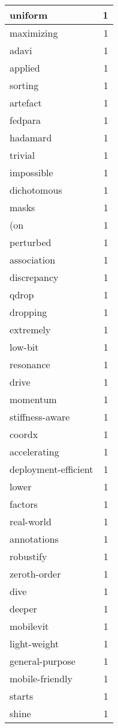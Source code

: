 \begin{table}[h]
\begin{tabular}{|l|r|}
\hline
uniform & 1 \\
\hline
maximizing & 1 \\
\hline
adavi & 1 \\
\hline
applied & 1 \\
\hline
sorting & 1 \\
\hline
artefact & 1 \\
\hline
fedpara & 1 \\
\hline
hadamard & 1 \\
\hline
trivial & 1 \\
\hline
impossible & 1 \\
\hline
dichotomous & 1 \\
\hline
masks & 1 \\
\hline
(on & 1 \\
\hline
perturbed & 1 \\
\hline
association & 1 \\
\hline
discrepancy & 1 \\
\hline
qdrop & 1 \\
\hline
dropping & 1 \\
\hline
extremely & 1 \\
\hline
low-bit & 1 \\
\hline
resonance & 1 \\
\hline
drive & 1 \\
\hline
momentum & 1 \\
\hline
stiffness-aware & 1 \\
\hline
coordx & 1 \\
\hline
accelerating & 1 \\
\hline
deployment-efficient & 1 \\
\hline
lower & 1 \\
\hline
factors & 1 \\
\hline
real-world & 1 \\
\hline
annotations & 1 \\
\hline
robustify & 1 \\
\hline
zeroth-order & 1 \\
\hline
dive & 1 \\
\hline
deeper & 1 \\
\hline
mobilevit & 1 \\
\hline
light-weight & 1 \\
\hline
general-purpose & 1 \\
\hline
mobile-friendly & 1 \\
\hline
starts & 1 \\
\hline
shine & 1 \\

\end{tabular}
\end{table}
